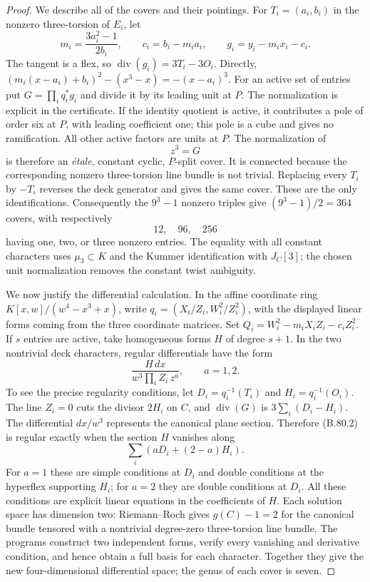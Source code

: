 \begin{proof}
We describe all of the covers and their pointings. For $T_i=(a_i,b_i)$
in the nonzero three-torsion of $E_i$, let
\[
 m_i=\frac{3a_i^2-1}{2b_i},\qquad c_i=b_i-m_i a_i,
 \qquad g_i=y_i-m_ix_i-c_i.
\]
The tangent is a flex, so
$\operatorname{div}(g_i)=3T_i-3O_i$. Directly,
$(m_i(x-a_i)+b_i)^2-(x^3-x)=-(x-a_i)^3$.
For an active set of entries put $G=\prod_iq_i^*g_i$ and divide
it by its leading unit at $P$. The normalization is explicit in the
certificate. If the identity quotient is active, it contributes a
pole of order six at $P$, with leading coefficient one; this pole
is a cube and gives no ramification. All other active factors are
units at $P$. The normalization of
\[
                             z^3=G
\]
is therefore an \emph{\'etale}, constant cyclic, $P$-split cover.
It is connected because the corresponding nonzero three-torsion
line bundle is not trivial. Replacing every $T_i$ by $-T_i$ reverses
the deck generator and gives the same cover. These are the only
identifications. Consequently the $9^3-1$ nonzero triples give
$(9^3-1)/2=364$ covers, with respectively
\[
               12,\quad 96,\quad 256
\]
having one, two, or three nonzero entries. The equality with all
constant characters uses $\mu_3\subset K$ and the Kummer
identification with $J_C[3]$; the chosen unit normalization removes
the constant twist ambiguity.

We now justify the differential calculation. In the affine coordinate
ring $K[x,w]/(w^4-x^3+x)$, write
$q_i=(X_i/Z_i,W_i^2/Z_i^2)$, with the displayed linear forms coming
from the three coordinate matrices. Set
$Q_i=W_i^2-m_iX_iZ_i-c_iZ_i^2$. If $s$ entries are active, take
homogeneous forms $H$ of degree $s+1$. In the two nontrivial deck
characters, regular differentials have the form
\[
                \frac{H\,dx}{w^3\prod_iZ_i\,z^a},
                         \qquad a=1,2.                       \tag{B.80.2}
\]
To see the precise regularity conditions, let
$D_i=q_i^{-1}(T_i)$ and $H_i=q_i^{-1}(O_i)$. The line $Z_i=0$
cuts the divisor $2H_i$ on $C$, and $\operatorname{div}(G)$ is
$3\sum_i(D_i-H_i)$. The differential $dx/w^3$ represents the
canonical plane section. Therefore (B.80.2) is regular exactly when
the section $H$ vanishes along
\[
                         \sum_i(aD_i+(2-a)H_i).
\]
For $a=1$ these are simple conditions at $D_i$ and double conditions
at the hyperflex supporting $H_i$; for $a=2$ they are double conditions
at $D_i$. All these conditions are explicit linear equations in the
coefficients of $H$. Each solution space has dimension two:
Riemann--Roch gives $g(C)-1=2$ for the canonical bundle tensored
with a nontrivial degree-zero three-torsion line bundle.
The programs construct two independent forms, verify every vanishing
and derivative condition, and hence obtain a full basis for each
character. Together they give the new four-dimensional differential
space; the genus of each cover is seven.


\end{proof}

